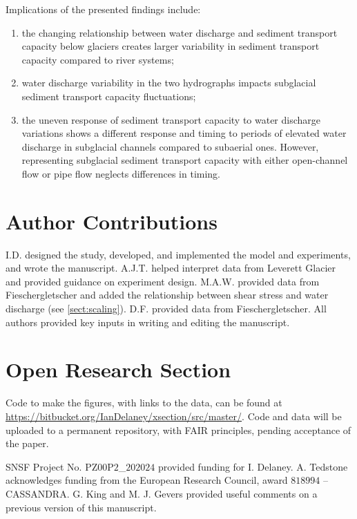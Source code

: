 \documentclass[draft]{agujournal2019}
\begin{document}
Implications of the presented findings include:
\begin{enumerate}
\item the changing relationship between water discharge and sediment transport capacity below glaciers creates larger variability in sediment transport capacity compared to river systems;
  \vspace{.1cm}
 
\item
  water discharge variability in the two hydrographs impacts subglacial sediment transport capacity fluctuations;
  \vspace{.1cm}
  
\item the uneven response of sediment transport capacity to water discharge variations shows a different response and timing to periods of elevated water discharge in subglacial channels compared to subaerial ones.
However, representing subglacial sediment transport capacity with either open-channel flow or pipe flow neglects differences in timing.
\end{enumerate}

\section*{Author Contributions}

I.D. designed the study, developed, and implemented the model and experiments, and wrote the manuscript.
A.J.T. helped interpret data from Leverett Glacier and provided guidance on experiment design.
M.A.W. provided data from Fieschergletscher and added the relationship between shear stress and water discharge (see \ref{sect:scaling}).
D.F. provided data from Fieschergletscher.
All authors provided key inputs in writing and editing the manuscript.


\section*{Open Research Section}

Code to make the figures, with links to the data, can be found at \url{https://bitbucket.org/IanDelaney/xsection/src/master/}.
Code and data will be uploaded to a permanent repository, with FAIR principles, pending acceptance of the paper.

\acknowledgments

SNSF Project No. $\mathrm{PZ00P2}$\_$202024$ provided  funding for I. Delaney.
A. Tedstone acknowledges funding from the European Research Council, award $818994$ -- CASSANDRA.
G. King and M. J. Gevers provided useful comments on a previous version of this manuscript.
\end{document}
